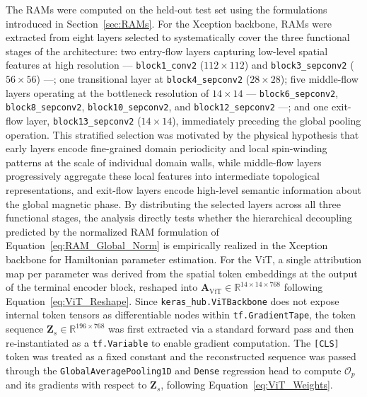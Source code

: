 \documentclass[final,5p,times,twocolumn]{elsarticle}
\begin{document}
The RAMs were computed on the held-out test set 
using the formulations introduced in 
Section~\ref{sec:RAMs}. For the Xception 
backbone, RAMs were extracted from eight layers 
selected to systematically cover the three 
functional stages of the architecture: two 
entry-flow layers capturing low-level spatial 
features at high resolution --- 
\texttt{block1\_conv2} ($112\times112$) and 
\texttt{block3\_sepconv2} ($56\times56$) ---; 
one transitional layer at 
\texttt{block4\_sepconv2} ($28\times28$); five 
middle-flow layers operating at the bottleneck 
resolution of $14\times14$ --- 
\texttt{block6\_sepconv2}, 
\texttt{block8\_sepconv2}, 
\texttt{block10\_sepconv2}, and 
\texttt{block12\_sepconv2} ---; and one 
exit-flow layer, \texttt{block13\_sepconv2} 
($14\times14$), immediately preceding the 
global pooling operation. This stratified 
selection was motivated by the physical 
hypothesis that early layers encode 
fine-grained domain periodicity and local 
spin-winding patterns at the scale of 
individual domain walls, while middle-flow 
layers progressively aggregate these local 
features into intermediate topological 
representations, and exit-flow layers encode 
high-level semantic information about the 
global magnetic phase. By distributing the 
selected layers across all three functional 
stages, the analysis directly tests whether 
the hierarchical decoupling predicted by the 
normalized RAM formulation of 
Equation~\ref{eq:RAM_Global_Norm} is 
empirically realized in the Xception backbone 
for Hamiltonian parameter estimation. For the 
ViT, a single attribution map per parameter 
was derived from the spatial token embeddings 
at the output of the terminal encoder block, 
reshaped into $\mathbf{A}_{\text{ViT}} \in 
\mathbb{R}^{14\times14\times768}$ following 
Equation~\ref{eq:ViT_Reshape}. Since 
\texttt{keras\_hub.ViTBackbone} does not expose 
internal token tensors as differentiable nodes 
within \texttt{tf.GradientTape}, the token 
sequence $\mathbf{Z}_s \in 
\mathbb{R}^{196\times768}$ was first extracted 
via a standard forward pass and then 
re-instantiated as a \texttt{tf.Variable} to 
enable gradient computation. The 
\texttt{[CLS]} token was treated as a fixed 
constant and the reconstructed sequence was 
passed through the \texttt{GlobalAveragePooling1D} 
and \texttt{Dense} regression head to compute 
$\mathcal{O}_p$ and its gradients with respect 
to $\mathbf{Z}_s$, following 
Equation~\ref{eq:ViT_Weights}.
\end{document}
